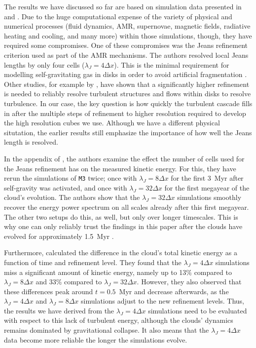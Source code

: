 \documentclass{aa}		%
\begin{document}
The results we have discussed so far are based on simulation data presented in  and .
Due to the huge computational expense of the variety of physical and numerical processes (fluid dynamics, AMR, supernovae, magnetic fields, radiative heating and cooling, and many more) within those simulations, though, they have required some compromises.
One of these compromises was the Jeans refinement criterion used as part of the AMR mechanisms.
The authors resolved local Jeans lengths by only four cells ($\lambda_J=4\Delta{}x$).
This is the minimal requirement for modelling self-gravitating gas in disks in order to avoid artificial fragmentation \citep{Truelove1998}. 
Other studies, for example by \citet{Turk2012}, have shown that a significantly higher refinement is needed to reliably resolve turbulent structures and flows within disks to resolve turbulence.  In our case, the key question is how quickly the turbulent cascade fills in after the multiple steps of refinement to higher resolution required to develop the high resolution cubes we use.  
Although we have a different physical situtation, the earlier results still emphasize the importance of how well the Jeans length is resolved.

In the appendix of , the authors examine the effect the number of cells used for the Jeans refinement has on the measured kinetic energy.
For this, they have rerun the simulations of \texttt{M3} twice; 
once with $\lambda_J=8\Delta{}x$ for the first 3~Myr after self-gravity was activated, and once with $\lambda_J=32\Delta{}x$ for the first megayear of the cloud's evolution.
The authors show that the $\lambda_J=32\Delta{}x$ simulations smoothly recover the energy power spectrum on all scales already after this first megayear.
The other two setups do this, as well, but only over longer timescales.
This is why one can only reliably trust the findings in this paper after the clouds have evolved for approximately 1.5~Myr \citep[see also][]{IbanezMejia2017,Seifried2017b}.

Furthermore,  calculated the difference in the cloud's total kinetic energy as a function of time and refinement level.
They found that the $\lambda_J = 4\Delta{}x$ simulations miss a significant amount of kinetic energy, namely up to 13\% compared to $\lambda_J = 8\Delta{}x$ and 33\% compared to $\lambda_J = 32\Delta{}x$.
However, they also observed that these differences peak around $t=0.5$~Myr and decrease afterwards, as the $\lambda_J = 4\Delta{}x$ and $\lambda_J = 8\Delta{}x$ simulations adjust to the new refinement levels.
Thus, the results we have derived from the $\lambda_J = 4\Delta{}x$ simulations need to be evaluated with respect to this lack of turbulent energy, although the clouds' dynamics remains dominated by gravitational collapse.
It also means that the $\lambda_J = 4\Delta{}x$ data become more reliable the longer the simulations evolve.
\end{document}
